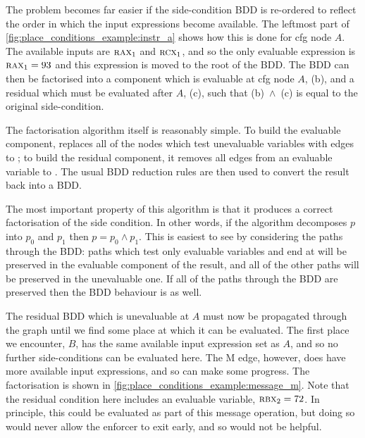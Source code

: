 The problem becomes far easier if the side-condition BDD is re-ordered
to reflect the order in which the input expressions become available.
The leftmost part of \autoref{fig:place_conditions_example:instr_a}
shows how this is done for \gls{cfg} node $A$.  The available inputs
are $\textsc{rax}_1$ and $\textsc{rcx}_1$, and so the only evaluable
expression is $\textsc{rax}_1 = 93$ and this expression is moved to
the root of the BDD.  The BDD can then be factorised into a component
which is evaluable at \gls{cfg} node $A$, (b), and a residual which
must be evaluated after $A$, (c), such that (b)~$\wedge$~(c) is equal
to the original side-condition.

The factorisation algorithm itself is reasonably simple.  To build the
evaluable component, {\technique} replaces all of the nodes which
test unevaluable variables with edges to \true; to build the
residual component, it removes all edges from an evaluable variable
to \false.  The usual BDD reduction rules are then used to convert the
result back into a BDD.

The most important property of this algorithm is that it produces a
correct factorisation of the side condition.  In other words, if the
algorithm decomposes $p$ into $p_0$ and $p_1$ then $p = p_0 \wedge
p_1$.  This is easiest to see by considering the paths through the
BDD: paths which test only evaluable variables and end at {\false}
will be preserved in the evaluable component of the result, and all
of the other paths will be preserved in the unevaluable one.  If all
of the paths through the BDD are preserved then the BDD behaviour is
as well.

The residual BDD which is unevaluable at $A$ must now be propagated
through the graph until we find some place at which it can be
evaluated.  The first place we encounter, $B$, has the same available
input expression set as $A$, and so no further side-conditions can be
evaluated here.  The M edge, however, does have more available input
expressions, and so can make some progress.  The factorisation is
shown in \autoref{fig:place_conditions_example:message_m}.  Note
that the residual condition here includes an evaluable variable,
$\textsc{rbx}_2 = 72$.  In principle, this could be evaluated as part
of this message operation, but doing so would never allow the enforcer
to exit early, and so would not be helpful.

